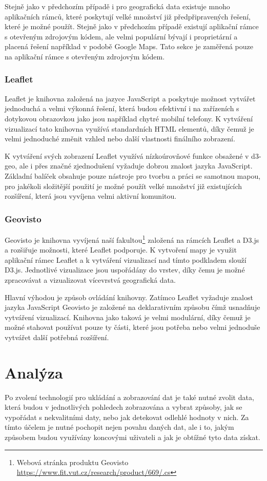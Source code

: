 Stejně jako v předchozím případě i pro geografická data existuje mnoho aplikačních rámců, které poskytují velké množství již předpřipravených řešení, které je možné použít. Stejně jako v předchozím případě existují aplikační rámce s otevřeným zdrojovým kódem, ale velmi populární bývají i proprietární a placená řešení například v podobě Google Maps. Tato sekce je zaměřená pouze na aplikační rámce s otevřeným zdrojovým kódem.

\subsection*{Leaflet}
Leaflet je knihovna založená na jazyce JavaScript a poskytuje možnost vytvářet jednoduchá a velmi výkonná řešení, která budou efektivní i na zařízeních s dotykovou obrazovkou jako jsou například chytré mobilní telefony. K vytváření vizualizací tato knihovna využívá standardních HTML elementů, díky čemuž je velmi jednoduché změnit vzhled nebo další vlastnosti finálního zobrazení.

K vytváření svých zobrazení Leaflet využívá nízkoúrovňové funkce obsažené v d3-geo, ale i přes značné zjednodušení vyžaduje dobrou znalost jazyka JavaScript. Základní balíček obsahuje pouze nástroje pro tvorbu a práci se samotnou mapou, pro jakékoli složitější použití je možné použít velké množství již existujících rozšíření, která jsou vyvíjena velmi aktivní komunitou.
\subsection*{Geovisto}
Geovisto je knihovna vyvíjená naší fakultou\footnote{Webová stránka produktu Geovisto \url{https://www.fit.vut.cz/research/product/669/.cs}} založená na rámcích Leaflet a D3.js a rozšiřuje možnosti, které Leaflet podporuje. K vytvoření mapy je využit aplikační rámec Leaflet a k vytváření vizualizací nad tímto podkladem slouží D3.js. Jednotlivé vizualizace jsou uspořádány do vrstev, díky čemu je možné zpracovávat a vizualizovat vícevrstvá geografická data.

Hlavní výhodou je způsob ovládání knihovny. Zatímco Leaflet vyžaduje znalost jazyka JavaScript Geovisto je založené na deklarativním způsobu čímž usnadňuje vytváření vizualizací. Knihovna jako taková je velmi modulární, díky čemuž je možné stahovat používat pouze ty části, které jsou potřeba nebo velmi jednoduše vytvářet další potřebná rozšíření.

\chapter{Analýza}
\label{chapter_analysis}
Po zvolení technologií pro ukládání a zobrazování dat je také nutné zvolit data, která budou v jednotlivých pohledech zobrazována a vybrat způsoby, jak se vypořádat s nekvalitními daty, nebo jak detekovat odlehlé hodnoty v nich. Za tímto účelem je nutné pochopit nejen povahu daných dat, ale i to, jakým způsobem budou využívány koncovými uživateli a jak je obtížné tyto data získat.

